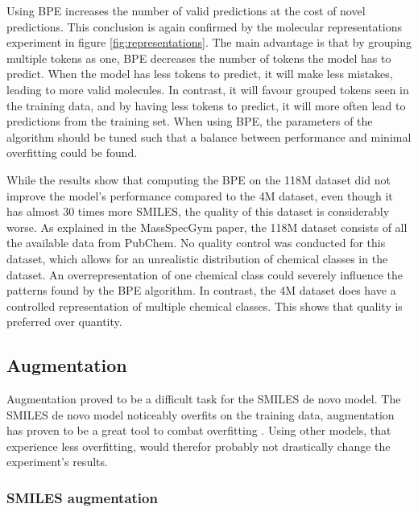 Using \ac{BPE} increases the number of valid predictions at the cost of novel predictions. 
This conclusion is again confirmed by the molecular representations experiment in figure \ref{fig:representations}.
The main advantage is that by grouping multiple tokens as one, \ac{BPE} decreases the number of tokens the model has to predict.
When the model has less tokens to predict, it will make less mistakes, leading to more valid molecules.
In contrast, it will favour grouped tokens seen in the training data, and by having less tokens to predict, it will more often lead to predictions from the training set.
When using \ac{BPE}, the parameters of the algorithm should be tuned such that a balance between performance and minimal overfitting could be found.

While the results show that computing the \ac{BPE} on the 118M dataset did not improve the model's performance compared to the 4M dataset, even though it has almost 30 times more SMILES,
the quality of this dataset is considerably worse.
As explained in the MassSpecGym paper, the 118M dataset consists of all the available data from PubChem. 
No quality control was conducted for this dataset, which allows for an unrealistic distribution of chemical classes in the dataset.
An overrepresentation of one chemical class could severely influence the patterns found by the \ac{BPE} algorithm.
In contrast, the 4M dataset does have a controlled representation of multiple chemical classes.
This shows that quality is preferred over quantity.

\subsection{Augmentation}

Augmentation proved to be a difficult task for the SMILES de novo model.
The SMILES de novo model noticeably overfits on the training data, augmentation has proven to be a great tool to combat overfitting \cite{shorten2019survey}.
Using other models, that experience less overfitting, would therefor probably not drastically change the experiment's results.

\subsubsection*{SMILES augmentation}

